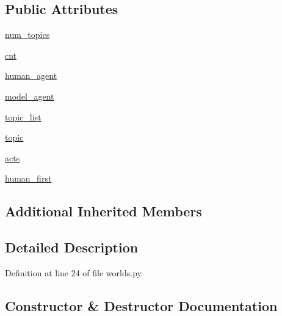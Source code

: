 \subsection*{Public Attributes}
\begin{DoxyCompactItemize}
\item 
\hyperlink{classparlai_1_1tasks_1_1wizard__of__wikipedia_1_1worlds_1_1InteractiveWorld_a32f2d277a7892c9e8c7c64c12a8f4ba7}{num\+\_\+topics}
\item 
\hyperlink{classparlai_1_1tasks_1_1wizard__of__wikipedia_1_1worlds_1_1InteractiveWorld_ac89fdf4af0e037452e4e965560b68eea}{cnt}
\item 
\hyperlink{classparlai_1_1tasks_1_1wizard__of__wikipedia_1_1worlds_1_1InteractiveWorld_a54ecd8d0f7c5dd064d0c2b511f9ac03b}{human\+\_\+agent}
\item 
\hyperlink{classparlai_1_1tasks_1_1wizard__of__wikipedia_1_1worlds_1_1InteractiveWorld_abc5413fa516f7fb0cc4e0c52d918d572}{model\+\_\+agent}
\item 
\hyperlink{classparlai_1_1tasks_1_1wizard__of__wikipedia_1_1worlds_1_1InteractiveWorld_ad323b2b928a31a0b048059a1569ae8f2}{topic\+\_\+list}
\item 
\hyperlink{classparlai_1_1tasks_1_1wizard__of__wikipedia_1_1worlds_1_1InteractiveWorld_ad248b70f56a67f58e7799eb126315169}{topic}
\item 
\hyperlink{classparlai_1_1tasks_1_1wizard__of__wikipedia_1_1worlds_1_1InteractiveWorld_af926c611144cdc54b7f1c631286b388b}{acts}
\item 
\hyperlink{classparlai_1_1tasks_1_1wizard__of__wikipedia_1_1worlds_1_1InteractiveWorld_a8a0ba61c930502f811dd033a6e52c327}{human\+\_\+first}
\end{DoxyCompactItemize}
\subsection*{Additional Inherited Members}


\subsection{Detailed Description}


Definition at line 24 of file worlds.\+py.



\subsection{Constructor \& Destructor Documentation}
\mbox{\label{classparlai_1_1tasks_1_1wizard__of__wikipedia_1_1worlds_1_1InteractiveWorld_a17330f1fd256bd53eafea1c7e119d77d}} 
